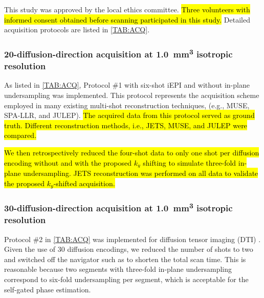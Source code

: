 \documentclass[preprint,12pt,authoryear,review]{elsarticle}
\begin{document}

    This study was approved by the local ethics committee. 
    \hl{Three volunteers with informed consent obtained before scanning
    participated in this study.}
    Detailed acquisition protocols are listed in \cref{TAB:ACQ}.


	\subsubsection{20-diffusion-direction acquisition
    at \SI{1.0}{\cubic\milli\meter} isotropic resolution}

	As listed in \cref{TAB:ACQ}, Protocol \#1
	with six-shot iEPI and without in-plane undersampling
	was implemented. This protocol represents the acquisition scheme
	employed in many existing multi-shot reconstruction techniques,
	(e.g., MUSE, SPA-LLR, and JULEP).
	\hl{The acquired data from this protocol served as ground truth.
    Different reconstruction methods,
    i.e., JETS, MUSE, and JULEP were compared.}

	\hl{We then retrospectively reduced the four-shot data to only one shot
	per diffusion encoding without and with the proposed $k_y$ shifting
    to simulate three-fold in-plane undersampling.
    JETS reconstruction was performed on all data to validate
    the proposed $k_y$-shifted acquisition.}


    \subsubsection{30-diffusion-direction acquisition
    at \SI{1.0}{\cubic\milli\meter} isotropic resolution}

    Protocol \#2 in \cref{TAB:ACQ} was implemented
    for diffusion tensor imaging (DTI) \citep{basser_1994_dmri}.
    Given the use of 30 diffusion encodings,
    we reduced the number of shots to two and switched off the navigator
    such as to shorten the total scan time.
    This is reasonable because two segments
    with three-fold in-plane undersampling
    correspond to six-fold undersampling per segment,
    which is acceptable for the self-gated phase estimation.
\end{document}
